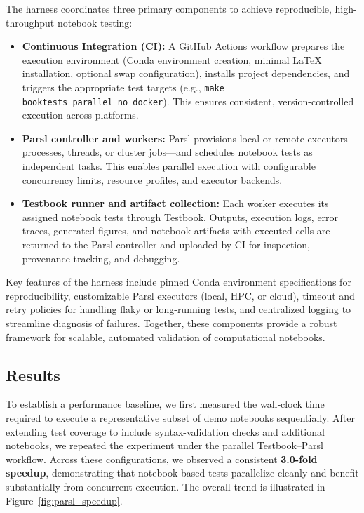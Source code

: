 The harness coordinates three primary components to achieve reproducible,
high-throughput notebook testing:

\begin{itemize}
    \item \textbf{Continuous Integration (CI):} A GitHub Actions workflow
    prepares the execution environment (Conda environment creation, minimal
    \LaTeX{} installation, optional swap configuration), installs project
    dependencies, and triggers the appropriate test targets (e.g.,
    \texttt{make booktests\_parallel\_no\_docker}). This ensures consistent,
    version-controlled execution across platforms.

    \item \textbf{Parsl controller and workers:} Parsl provisions local or
    remote executors---processes, threads, or cluster jobs---and schedules
    notebook tests as independent tasks. This enables parallel execution with
    configurable concurrency limits, resource profiles, and executor backends.

    \item \textbf{Testbook runner and artifact collection:} Each worker
    executes its assigned notebook tests through Testbook. Outputs, execution
    logs, error traces, generated figures, and notebook artifacts with executed
    cells are returned to the Parsl controller and uploaded by CI for
    inspection, provenance tracking, and debugging.
\end{itemize}

Key features of the harness include pinned Conda environment specifications for
reproducibility, customizable Parsl executors (local, HPC, or cloud), timeout
and retry policies for handling flaky or long-running tests, and centralized
logging to streamline diagnosis of failures. Together, these components provide
a robust framework for scalable, automated validation of computational
notebooks.


\subsection{Results}


To establish a performance baseline, we first measured the wall‐clock time
required to execute a representative subset of demo notebooks sequentially.
After extending test coverage to include syntax-validation checks and
additional notebooks, we repeated the experiment under the parallel
Testbook–Parsl workflow. Across these configurations, we observed a consistent
\textbf{3.0-fold speedup}, demonstrating that notebook-based tests parallelize
cleanly and benefit substantially from concurrent execution. The overall trend
is illustrated in Figure~\ref{fig:parsl_speedup}.

